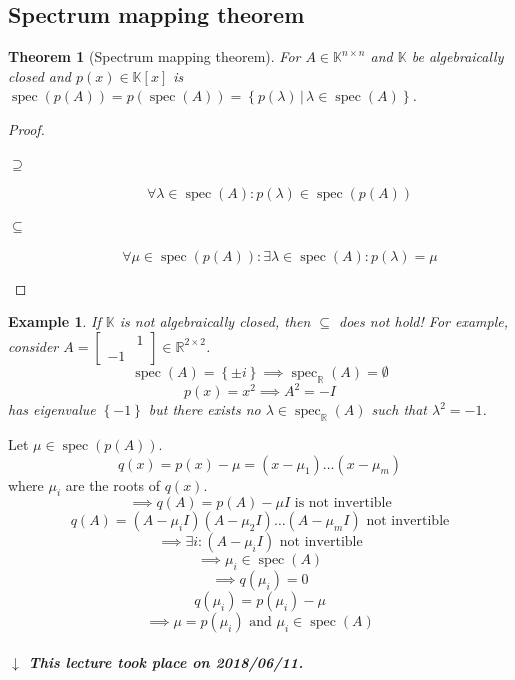 \documentclass{article}
\newtheorem{theorem}{Theorem}  \numberwithin{theorem}{section}
\newtheorem{example}{Example}  \numberwithin{example}{section}
\newcommand{\set}[1]{\left\{#1\right\}}
\newcommand{\setdef}[2]{\left\{\left.#1\,\right|\,#2\right\}}
\newcommand{\dateref}[1]{%
  \begin{mdframed}[backgroundcolor=gray!10,innerbottommargin=0pt,innertopmargin=0pt]
    \paragraph{\textit{$\downarrow$ This lecture took place on #1.}}%
  \end{mdframed}%
}
\begin{document}
\subsection{Spectrum mapping theorem}

\begin{theorem}[Spectrum mapping theorem] %
  For $A \in \mathbb K^{n\times n}$ and $\mathbb K$ be algebraically closed and $p(x) \in \mathbb K[x]$
  is $\operatorname{spec}(p(A)) = p(\operatorname{spec}(A)) = \setdef{p(\lambda)}{\lambda \in \operatorname{spec}(A)}$.
\end{theorem}

\begin{proof}
  \begin{description}
    \item[$\mathbf{\supseteq}$]
      \[ \forall \lambda \in \operatorname{spec}(A): p(\lambda) \in \operatorname{spec}(p(A)) \]
    \item[$\mathbf{\subseteq}$]
      \[ \forall \mu \in \operatorname{spec}(p(A)): \exists \lambda \in \operatorname{spec}(A): p(\lambda) = \mu \]
  \end{description}
\end{proof}

\begin{example} %
  If $\mathbb K$ is not algebraically closed, then $\subseteq$ does not hold!
  For example, consider $A = \begin{bmatrix} & 1 \\ -1 & \end{bmatrix} \in \mathbb R^{2 \times 2}$.
  \[ \operatorname{spec}(A) = \set{\pm i} \implies \operatorname{spec}_{\mathbb R}(A) = \emptyset \]
  \[ p(x) = x^2 \implies A^2 = -I \]
  has eigenvalue $\set{-1}$ but there exists no $\lambda \in \operatorname{spec}_{\mathbb R}(A)$ such that $\lambda^2 = -1$.
\end{example}

Let $\mu \in \operatorname{spec}(p(A))$.
\[ q(x) = p(x) - \mu = (x - \mu_1) \dots (x - \mu_m) \]
where $\mu_i$ are the roots of $q(x)$.
\[ \implies q(A) = p(A) - \mu I \text{ is not invertible} \]
\[ q(A) = (A - \mu_i I)(A - \mu_2 I) \dots (A - \mu_m I) \text{ not invertible} \]
\[ \implies \exists i: (A - \mu_i I) \text{ not invertible} \]
\[ \implies \mu_i \in \operatorname{spec}(A) \]
\[ \implies q(\mu_i) = 0 \]
\[ q(\mu_i) = p(\mu_i) - \mu \]
\[ \implies \mu = p(\mu_i) \text{ and } \mu_i \in \operatorname{spec}(A) \]

\dateref{2018/06/11}
\end{document}

